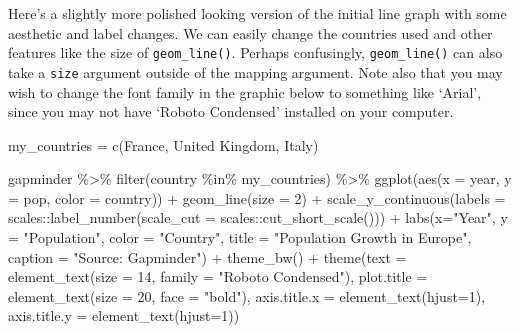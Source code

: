 \documentclass[
  letterpaper,
]{book}
\newenvironment{Shaded}{\begin{snugshade}}{\end{snugshade}}
\newcommand{\AttributeTok}[1]{\textcolor[rgb]{0.40,0.45,0.13}{#1}}
\newcommand{\DecValTok}[1]{\textcolor[rgb]{0.68,0.00,0.00}{#1}}
\newcommand{\FunctionTok}[1]{\textcolor[rgb]{0.28,0.35,0.67}{#1}}
\newcommand{\NormalTok}[1]{\textcolor[rgb]{0.00,0.23,0.31}{#1}}
\newcommand{\OtherTok}[1]{\textcolor[rgb]{0.00,0.23,0.31}{#1}}
\newcommand{\SpecialCharTok}[1]{\textcolor[rgb]{0.37,0.37,0.37}{#1}}
\newcommand{\StringTok}[1]{\textcolor[rgb]{0.13,0.47,0.30}{#1}}
\begin{document}
Here's a slightly more polished looking version of the initial line
graph with some aesthetic and label changes. We can easily change the
countries used and other features like the size of
\texttt{geom\_line()}. Perhaps confusingly, \texttt{geom\_line()} can
also take a \texttt{size} argument outside of the mapping argument. Note
also that you may wish to change the font family in the graphic below to
something like `Arial', since you may not have `Roboto Condensed'
installed on your computer.

\begin{Shaded}
\begin{Highlighting}[]
\NormalTok{my\_countries }\OtherTok{=} \FunctionTok{c}\NormalTok{(}\StringTok{\textquotesingle{}France\textquotesingle{}}\NormalTok{, }\StringTok{\textquotesingle{}United Kingdom\textquotesingle{}}\NormalTok{, }\StringTok{\textquotesingle{}Italy\textquotesingle{}}\NormalTok{)}

\NormalTok{gapminder }\SpecialCharTok{\%\textgreater{}\%}
  \FunctionTok{filter}\NormalTok{(country }\SpecialCharTok{\%in\%}\NormalTok{ my\_countries) }\SpecialCharTok{\%\textgreater{}\%}
  \FunctionTok{ggplot}\NormalTok{(}\FunctionTok{aes}\NormalTok{(}\AttributeTok{x =}\NormalTok{ year, }
             \AttributeTok{y =}\NormalTok{ pop, }
             \AttributeTok{color =}\NormalTok{ country)) }\SpecialCharTok{+}
  \FunctionTok{geom\_line}\NormalTok{(}\AttributeTok{size =} \DecValTok{2}\NormalTok{) }\SpecialCharTok{+}  
  \FunctionTok{scale\_y\_continuous}\NormalTok{(}\AttributeTok{labels =}\NormalTok{ scales}\SpecialCharTok{::}\FunctionTok{label\_number}\NormalTok{(}\AttributeTok{scale\_cut =}\NormalTok{ scales}\SpecialCharTok{::}\FunctionTok{cut\_short\_scale}\NormalTok{())) }\SpecialCharTok{+} 
  \FunctionTok{labs}\NormalTok{(}\AttributeTok{x=}\StringTok{"Year"}\NormalTok{,}
       \AttributeTok{y =} \StringTok{"Population"}\NormalTok{,}
       \AttributeTok{color =} \StringTok{"Country"}\NormalTok{,}
       \AttributeTok{title =} \StringTok{"Population Growth in Europe"}\NormalTok{,}
       \AttributeTok{caption =} \StringTok{"Source: Gapminder"}\NormalTok{) }\SpecialCharTok{+} 
  \FunctionTok{theme\_bw}\NormalTok{() }\SpecialCharTok{+} 
  \FunctionTok{theme}\NormalTok{(}\AttributeTok{text =} \FunctionTok{element\_text}\NormalTok{(}\AttributeTok{size =} \DecValTok{14}\NormalTok{, }\AttributeTok{family =} \StringTok{"Roboto Condensed"}\NormalTok{),}
                     \AttributeTok{plot.title =} \FunctionTok{element\_text}\NormalTok{(}\AttributeTok{size =} \DecValTok{20}\NormalTok{, }\AttributeTok{face =} \StringTok{"bold"}\NormalTok{),}
                     \AttributeTok{axis.title.x =} \FunctionTok{element\_text}\NormalTok{(}\AttributeTok{hjust=}\DecValTok{1}\NormalTok{), }
                     \AttributeTok{axis.title.y =} \FunctionTok{element\_text}\NormalTok{(}\AttributeTok{hjust=}\DecValTok{1}\NormalTok{))}
\end{Highlighting}
\end{Shaded}
\end{document}
